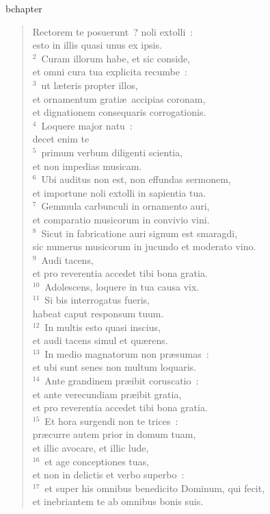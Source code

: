 bchapter\begin{verse}\vspace{-19pt}Rectorem te posuerunt~? noli extolli~:\\ esto in illis quasi unus ex ipsis.\\
${}^{2}$~Curam illorum habe, et sic conside,\\ et omni cura tua explicita recumbe~:\\
${}^{3}$~ut l\ae teris propter illos,\\ et ornamentum grati\ae\ accipias coronam,\\ et dignationem consequaris corrogationis.\\
${}^{4}$~Loquere major natu~:\\ decet enim te\\
${}^{5}$~primum verbum diligenti scientia,\\ et non impedias musicam.\\
${}^{6}$~Ubi auditus non est, non effundas sermonem,\\ et importune noli extolli in sapientia tua.\\
${}^{7}$~Gemmula carbunculi in ornamento auri,\\ et comparatio musicorum in convivio vini.\\
${}^{8}$~Sicut in fabricatione auri signum est smaragdi,\\ sic numerus musicorum in jucundo et moderato vino.\\
${}^{9}$~Audi tacens,\\ et pro reverentia accedet tibi bona gratia.\\
${}^{10}$~Adolescens, loquere in tua causa vix.\\
${}^{11}$~Si bis interrogatus fueris,\\ habeat caput responsum tuum.\\
${}^{12}$~In multis esto quasi inscius,\\ et audi tacens simul et qu\ae rens.\\
${}^{13}$~In medio magnatorum non pr\ae sumas~:\\ et ubi sunt senes non multum loquaris.\\
${}^{14}$~Ante grandinem pr\ae ibit coruscatio~:\\ et ante verecundiam pr\ae ibit gratia,\\ et pro reverentia accedet tibi bona gratia.\\
${}^{15}$~Et hora surgendi non te trices~:\\ pr\ae curre autem prior in domum tuam,\\ et illic avocare, et illic lude,\\
${}^{16}$~et age conceptiones tuas,\\ et non in delictis et verbo superbo~:\\
${}^{17}$~et super his omnibus benedicito Dominum, qui fecit,\\ et inebriantem te ab omnibus bonis suis.\end{verse}


